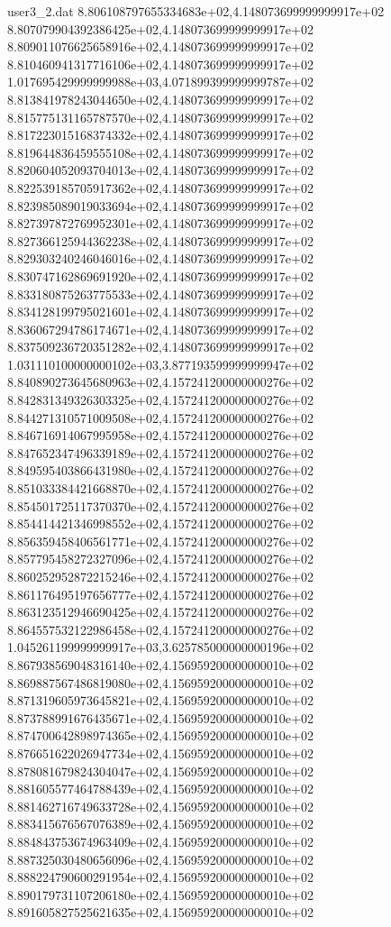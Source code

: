 \begin{filecontents}{user3_2.dat}
8.806108797655334683e+02,4.148073699999999917e+02
8.807079904392386425e+02,4.148073699999999917e+02
8.809011076625658916e+02,4.148073699999999917e+02
8.810460941317716106e+02,4.148073699999999917e+02
1.017695429999999988e+03,4.071899399999999787e+02
8.813841978243044650e+02,4.148073699999999917e+02
8.815775131165787570e+02,4.148073699999999917e+02
8.817223015168374332e+02,4.148073699999999917e+02
8.819644836459555108e+02,4.148073699999999917e+02
8.820604052093704013e+02,4.148073699999999917e+02
8.822539185705917362e+02,4.148073699999999917e+02
8.823985089019033694e+02,4.148073699999999917e+02
8.827397872769952301e+02,4.148073699999999917e+02
8.827366125944362238e+02,4.148073699999999917e+02
8.829303240246046016e+02,4.148073699999999917e+02
8.830747162869691920e+02,4.148073699999999917e+02
8.833180875263775533e+02,4.148073699999999917e+02
8.834128199795021601e+02,4.148073699999999917e+02
8.836067294786174671e+02,4.148073699999999917e+02
8.837509236720351282e+02,4.148073699999999917e+02
1.031110100000000102e+03,3.877193599999999947e+02
8.840890273645680963e+02,4.157241200000000276e+02
8.842831349326303325e+02,4.157241200000000276e+02
8.844271310571009508e+02,4.157241200000000276e+02
8.846716914067995958e+02,4.157241200000000276e+02
8.847652347496339189e+02,4.157241200000000276e+02
8.849595403866431980e+02,4.157241200000000276e+02
8.851033384421668870e+02,4.157241200000000276e+02
8.854501725117370370e+02,4.157241200000000276e+02
8.854414421346998552e+02,4.157241200000000276e+02
8.856359458406561771e+02,4.157241200000000276e+02
8.857795458272327096e+02,4.157241200000000276e+02
8.860252952872215246e+02,4.157241200000000276e+02
8.861176495197656777e+02,4.157241200000000276e+02
8.863123512946690425e+02,4.157241200000000276e+02
8.864557532122986458e+02,4.157241200000000276e+02
1.045261199999999917e+03,3.625785000000000196e+02
8.867938569048316140e+02,4.156959200000000010e+02
8.869887567486819080e+02,4.156959200000000010e+02
8.871319605973645821e+02,4.156959200000000010e+02
8.873788991676435671e+02,4.156959200000000010e+02
8.874700642898974365e+02,4.156959200000000010e+02
8.876651622026947734e+02,4.156959200000000010e+02
8.878081679824304047e+02,4.156959200000000010e+02
8.881605577464788439e+02,4.156959200000000010e+02
8.881462716749633728e+02,4.156959200000000010e+02
8.883415676567076389e+02,4.156959200000000010e+02
8.884843753674963409e+02,4.156959200000000010e+02
8.887325030480656096e+02,4.156959200000000010e+02
8.888224790600291954e+02,4.156959200000000010e+02
8.890179731107206180e+02,4.156959200000000010e+02
8.891605827525621635e+02,4.156959200000000010e+02

\end{filecontents}
